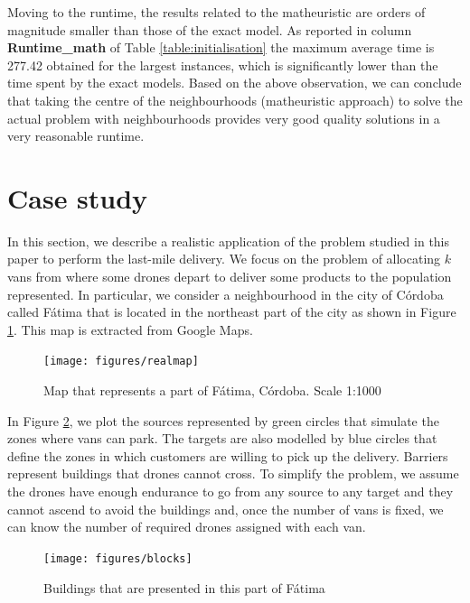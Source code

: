 \documentclass[a4paper,  review, authoryear, 1p.]{elsarticle}
\newcommand{\CV}[1]{{\color{blue}#1}}
\begin{document}
{Moving to the runtime, the results related to the matheuristic are orders of magnitude smaller than those of the exact model. 	As reported in column \textbf{Runtime\_math} of Table \ref{table:initialisation} the maximum average time is 277.42 obtained for the largest instances, which is significantly lower than the time spent by the exact models. Based on the above observation, we can conclude that taking the centre of the neighbourhoods (matheuristic approach) to solve the actual problem with neighbourhoods provides very good quality solutions in a very reasonable runtime.}
			
				
				
%				
%		
		
		\CV{
		\section{Case study}\label{section:casestudy}
		In this section, we describe a realistic application of the problem studied in this paper to perform the last-mile delivery. We focus on the problem of allocating $k$ vans from where some drones depart to deliver some products to the population represented. In particular, we consider a neighbourhood in the city of Córdoba called Fátima that is located in the northeast part of the city as shown in Figure \ref{fig:realmap}. This map is extracted from Google Maps.
		
		\begin{figure}[H]
			\centering
			\caption{Map that represents a part of Fátima, Córdoba. Scale 1:1000}
			\texttt{[image: figures/realmap]}
			\label{fig:realmap}

		\end{figure}
		
		In Figure \ref{fig:blocks}, we plot the sources represented by green circles that simulate the zones where vans can park. The targets are also modelled by blue circles that define the zones in which customers are willing to pick up the delivery. Barriers represent buildings that drones cannot cross. To simplify the problem, we assume the drones have enough endurance to go from any source to any target and they cannot ascend to avoid the buildings and, once the number of vans is fixed, we can know the number of required drones assigned with each van.
		
		\begin{figure}[H]
			\centering
			\caption{Buildings that are presented in this part of Fátima}
			\texttt{[image: figures/blocks]}
			\label{fig:blocks}
		\end{figure}
		
}
\end{document}
